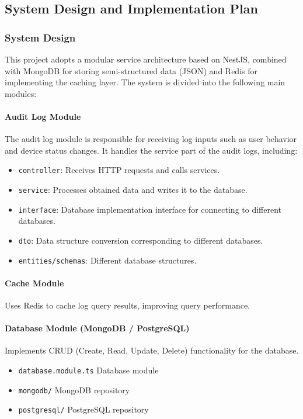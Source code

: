 \documentclass{article}
\begin{document}
\subsection{System Design and Implementation Plan}

\subsubsection{System Design}

This project adopts a modular service architecture based on NestJS, combined with MongoDB for storing semi-structured data (JSON) and Redis for implementing the caching layer. The system is divided into the following main modules:

\paragraph{Audit Log Module}
The audit log module is responsible for receiving log inputs such as user behavior and device status changes. It handles the service part of the audit logs, including:
\begin{itemize}
    \item \texttt{controller}: Receives HTTP requests and calls services.
    \item \texttt{service}: Processes obtained data and writes it to the database.
    \item \texttt{interface}: Database implementation interface for connecting to different databases.
    \item \texttt{dto}: Data structure conversion corresponding to different databases.
    \item \texttt{entities/schemas}: Different database structures.
\end{itemize}

\paragraph{Cache Module}
Uses Redis to cache log query results, improving query performance.

\paragraph{Database Module (MongoDB / PostgreSQL)}
Implements CRUD (Create, Read, Update, Delete) functionality for the database.
\begin{itemize}
    \item \texttt{database.module.ts} Database module
    \item \texttt{mongodb/} MongoDB repository
    \item \texttt{postgresql/} PostgreSQL repository
\end{itemize}
\end{document}
